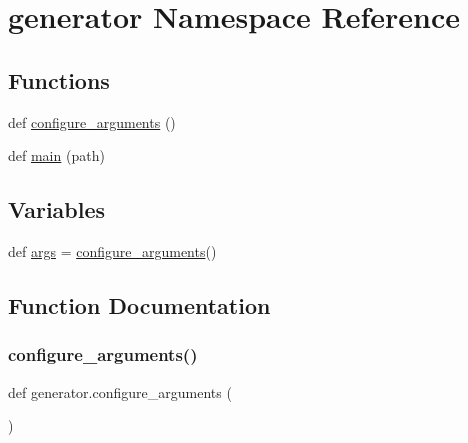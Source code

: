 \hypertarget{namespacegenerator}{}\section{generator Namespace Reference}
\label{namespacegenerator}
\subsection*{Functions}
\begin{DoxyCompactItemize}
\item 
def \hyperlink{namespacegenerator_a300e19c576b1e53645eb8811f9cc3f22}{configure\+\_\+arguments} ()
\item 
def \hyperlink{namespacegenerator_aeac4d92bc4bed52fb32f23c0b9416a01}{main} (path)
\end{DoxyCompactItemize}
\subsection*{Variables}
\begin{DoxyCompactItemize}
\item 
def \hyperlink{namespacegenerator_a3bbee52e6a87a6496700890e3344c874}{args} = \hyperlink{namespacegenerator_a300e19c576b1e53645eb8811f9cc3f22}{configure\+\_\+arguments}()
\end{DoxyCompactItemize}


\subsection{Function Documentation}
\mbox{\label{namespacegenerator_a300e19c576b1e53645eb8811f9cc3f22}} 
\subsubsection{\texorpdfstring{configure\+\_\+arguments()}{configure\_arguments()}}
{\footnotesize\ttfamily def generator.\+configure\+\_\+arguments (\begin{DoxyParamCaption}{ }\end{DoxyParamCaption})}

\mbox{\label{namespacegenerator_aeac4d92bc4bed52fb32f23c0b9416a01}} 
